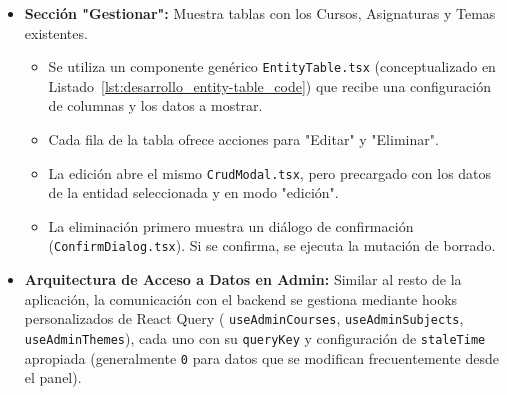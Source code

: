 \begin{itemize}[leftmargin=*]
    \item \textbf{Sección "Gestionar":} Muestra tablas con los Cursos, Asignaturas y Temas existentes.
        \begin{itemize}
            \item Se utiliza un componente genérico \texttt{EntityTable.tsx} (conceptualizado en Listado~\ref{lst:desarrollo_entity-table_code}) que recibe una configuración de columnas y los datos a mostrar.
            \item Cada fila de la tabla ofrece acciones para "Editar" y "Eliminar".
            \item La edición abre el mismo \texttt{CrudModal.tsx}, pero precargado con los datos de la entidad seleccionada y en modo "edición".
            \item La eliminación primero muestra un diálogo de confirmación (\texttt{ConfirmDialog.tsx}). Si se confirma, se ejecuta la mutación de borrado.
        \end{itemize}

    \item \textbf{Arquitectura de Acceso a Datos en Admin:} Similar al resto de la aplicación, la comunicación con el backend se gestiona mediante hooks personalizados de React Query ( \texttt{useAdminCourses}, \texttt{useAdminSubjects}, \texttt{useAdminThemes}), cada uno con su \texttt{queryKey} y configuración de \texttt{staleTime} apropiada (generalmente \texttt{0} para datos que se modifican frecuentemente desde el panel).
\end{itemize}

